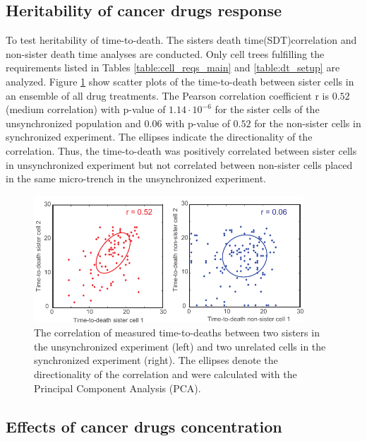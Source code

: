 \documentclass[pdftex,12pt,a4paper]{report}
\begin{document}
\subsection{Heritability of cancer drugs response}


To test heritability of time-to-death. The sisters death time(SDT)correlation and non-sister death time analyses are conducted. Only cell trees fulfilling the requirements listed in Tables \ref{table:cell_reqs_main} and \ref{table:dt_setup} are analyzed. Figure \ref{fig:image_scd} show scatter plots of the time-to-death between sister cells in an ensemble of all drug treatments. The Pearson correlation coefficient r is $0.52$ (medium correlation) with p-value of $1.14 \cdot 10^{-6}$ for the sister cells of the unsynchronized population and $0.06$ with p-value of $0.52$ for the non-sister cells in synchronized experiment. The ellipses indicate the directionality of the correlation. Thus, the time-to-death was positively correlated between sister cells in unsynchronized experiment but not correlated between non-sister cells placed in the same micro-trench in the unsynchronized experiment.

\begin{figure}[H]
\centering
\includegraphics[width=0.9\textwidth]{images/scd/scd.pdf}
\caption[The correlation of measured time-to-deaths between two sisters in the unsynchronized experiment and two unrelated cells in the synchronized experiment]{The correlation of measured time-to-deaths between two sisters in the unsynchronized experiment (left) and two unrelated cells in the synchronized experiment (right). The ellipses denote the directionality of the correlation and were calculated with the Principal Component Analysis (PCA).}
\label{fig:image_scd}
\end{figure}

\subsection{Effects of cancer drugs concentration}
\end{document}
